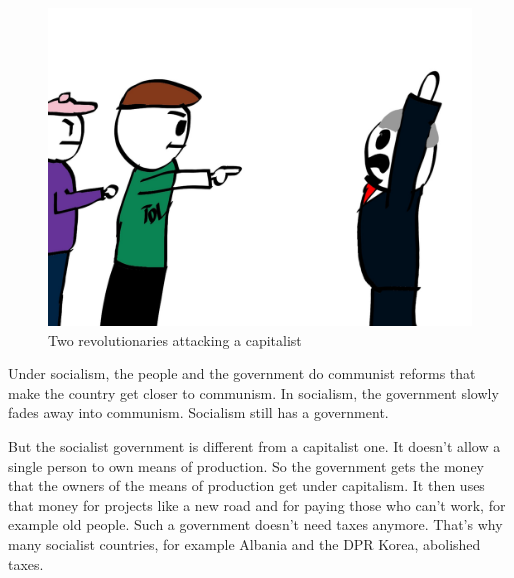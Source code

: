 \documentclass[a4paper]{book}%
\begin{document}
\begin{figure}[tbhp]
\centering
\includegraphics[height=0.3\textheight]{3-1.png}
\caption{Two revolutionaries attacking a capitalist}
\end{figure}

\newpage

Under socialism, the people and the government do communist reforms that make the country get closer to communism. In socialism, the government slowly fades away into communism. Socialism still has a government.

But the socialist government is different from a capitalist one. It doesn't allow a single person to own means of production. So the government gets the money that the owners of the means of production get under capitalism. It then uses that money for projects like a new road and for paying those who can't work, for example old people. Such a government doesn't need taxes anymore. That's why many socialist countries, for example Albania and the DPR Korea, abolished taxes.
\end{document}

